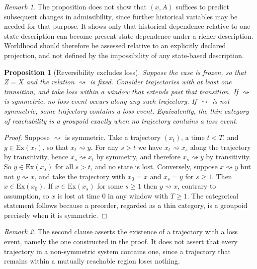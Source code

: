 \documentclass[11pt]{article}
\theoremstyle{definition}
\theoremstyle{plain}
\newtheorem{proposition}{Proposition}
\theoremstyle{remark}
\newtheorem*{remark}{Remark}
\newcommand{\reaches}{\rightsquigarrow}
\begin{document}
\begin{remark}
The proposition does not show that $(x, A)$ suffices to predict subsequent changes in admissibility, since further historical variables may be needed for that purpose. It shows only that historical dependence relative to one state description can become present-state dependence under a richer description. Worldhood should therefore be assessed relative to an explicitly declared projection, and not defined by the impossibility of any state-based description.
\end{remark}

\begin{proposition}[Reversibility excludes loss]\label{prop:reversible}
Suppose the case is frozen, so that $Z = X$ and the relation $\reaches$ is fixed. Consider trajectories with at least one transition, and take loss within a window that extends past that transition. If $\reaches$ is symmetric, no loss event occurs along any such trajectory. If $\reaches$ is not symmetric, some trajectory contains a loss event. Equivalently, the thin category of reachability is a groupoid exactly when no trajectory contains a loss event.
\end{proposition}

\begin{proof}
Suppose $\reaches$ is symmetric. Take a trajectory $(x_t)$, a time $t < T$, and $y \in \mathrm{Ex}(x_t)$, so that $x_t \reaches y$. For any $s > t$ we have $x_t \reaches x_s$ along the trajectory by transitivity, hence $x_s \reaches x_t$ by symmetry, and therefore $x_s \reaches y$ by transitivity. So $y \in \mathrm{Ex}(x_s)$ for all $s > t$, and no state is lost. Conversely, suppose $x \reaches y$ but not $y \reaches x$, and take the trajectory with $x_0 = x$ and $x_s = y$ for $s \ge 1$. Then $x \in \mathrm{Ex}(x_0)$. If $x \in \mathrm{Ex}(x_s)$ for some $s \ge 1$ then $y \reaches x$, contrary to assumption, so $x$ is lost at time $0$ in any window with $T \ge 1$. The categorical statement follows because a preorder, regarded as a thin category, is a groupoid precisely when it is symmetric.
\end{proof}

\begin{remark}
The second clause asserts the existence of a trajectory with a loss event, namely the one constructed in the proof. It does not assert that every trajectory in a non-symmetric system contains one, since a trajectory that remains within a mutually reachable region loses nothing.
\end{remark}
\end{document}
